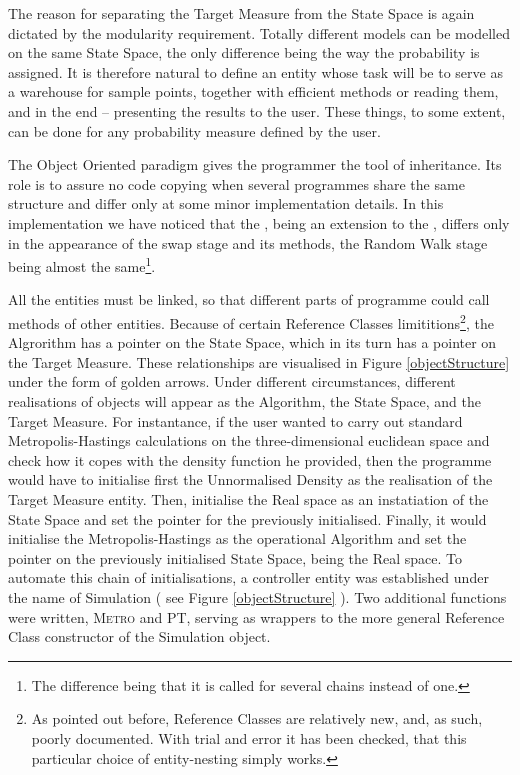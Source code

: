 \documentclass{book}
\begin{document}
The reason for separating the Target Measure from the State Space is again dictated by the modularity requirement. Totally different models can be modelled on the same State Space, the only difference being the way the probability is assigned. It is therefore natural to define an entity whose task will be to serve as a warehouse for sample points, together with efficient methods or reading them, and in the end -- presenting the results to the user. These things, to some extent, can be done for any probability measure defined by the user. 

The Object Oriented paradigm gives the programmer the tool of inheritance. Its role is to assure no code copying when several programmes share the same structure and differ only at some minor implementation details. In this implementation we have noticed that the \PT, being an extension to the \MH, differs only in the appearance of the swap stage and its methods, the Random Walk stage being almost the same\footnote{The difference being that it is called for several chains instead of one.}.    

All the entities must be linked, so that different parts of programme could call methods of other entities. Because of certain Reference Classes limititions\footnote{As pointed out before, Reference Classes are relatively new, and, as such, poorly documented. With trial and error it has been checked, that this particular choice of entity-nesting simply works.}, the Algrorithm has a pointer on the State Space, which in its turn has a pointer on the Target Measure. These relationships are visualised in Figure \ref{objectStructure} under the form of golden arrows. Under different circumstances, different realisations of objects will appear as the Algorithm, the State Space, and the Target Measure. For instantance, if the user wanted to carry out standard Metropolis-Hastings calculations on the three-dimensional euclidean space and check how it copes with the density function he provided, then the programme would have to initialise first the Unnormalised Density as the realisation of the Target Measure entity. Then, initialise the Real space as an instatiation of the State Space and set the pointer for the previously initialised. Finally, it would initialise the Metropolis-Hastings as the operational Algorithm and set the pointer on the previously initialised State Space, being the Real space. To automate this chain of initialisations, a controller entity was established under the name of Simulation ( see Figure \ref{objectStructure} ). Two additional functions were written, \textsc{Metro} and \textsc{PT}, serving as wrappers to the more general Reference Class constructor of the Simulation object. 
\end{document}
